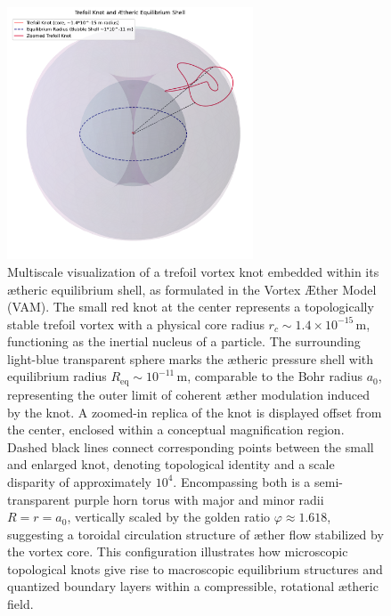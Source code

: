 \begin{figure}[h!]
    \centering
    \includegraphics[width=0.65\textwidth]{PressureProfileAroundCore3}
    \caption{Multiscale visualization of a trefoil vortex knot embedded within its ætheric equilibrium shell, as formulated in the Vortex Æther Model (VAM).
    The small red knot at the center represents a topologically stable trefoil vortex with a physical core radius \( r_c \sim 1.4 \times 10^{-15}\,\mathrm{m} \), functioning as the inertial nucleus of a particle.
    The surrounding light-blue transparent sphere marks the ætheric pressure shell with equilibrium radius \( R_{\text{eq}} \sim 10^{-11}\,\mathrm{m} \), comparable to the Bohr radius \( a_0 \), representing the outer limit of coherent æther modulation induced by the knot.
    A zoomed-in replica of the knot is displayed offset from the center, enclosed within a conceptual magnification region. Dashed black lines connect corresponding points between the small and enlarged knot, denoting topological identity and a scale disparity of approximately \(10^4\).
    Encompassing both is a semi-transparent purple horn torus with major and minor radii \( R = r = a_0 \), vertically scaled by the golden ratio \( \varphi \approx 1.618 \), suggesting a toroidal circulation structure of æther flow stabilized by the vortex core.
    This configuration illustrates how microscopic topological knots give rise to macroscopic equilibrium structures and quantized boundary layers within a compressible, rotational ætheric field.}
\end{figure}

